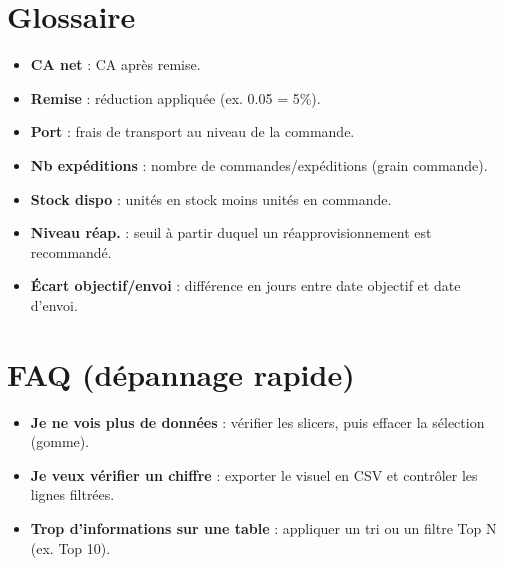 \documentclass[a4paper,12pt]{article}
\begin{document}
\newpage
\appendix

\section{Glossaire}
\begin{itemize}[leftmargin=*]
  \item \textbf{CA net} : CA après remise.
  \item \textbf{Remise} : réduction appliquée (ex. 0.05 = 5\%).
  \item \textbf{Port} : frais de transport au niveau de la commande.
  \item \textbf{Nb expéditions} : nombre de commandes/expéditions (grain commande).
  \item \textbf{Stock dispo} : unités en stock moins unités en commande.
  \item \textbf{Niveau réap.} : seuil à partir duquel un réapprovisionnement est recommandé.
  \item \textbf{Écart objectif/envoi} : différence en jours entre date objectif et date d’envoi.
\end{itemize}

\section{FAQ (dépannage rapide)}
\begin{itemize}[leftmargin=*]
  \item \textbf{Je ne vois plus de données} : vérifier les slicers, puis effacer la sélection (gomme).
  \item \textbf{Je veux vérifier un chiffre} : exporter le visuel en CSV et contrôler les lignes filtrées.
  \item \textbf{Trop d’informations sur une table} : appliquer un tri ou un filtre Top N (ex. Top 10).
\end{itemize}
\end{document}
